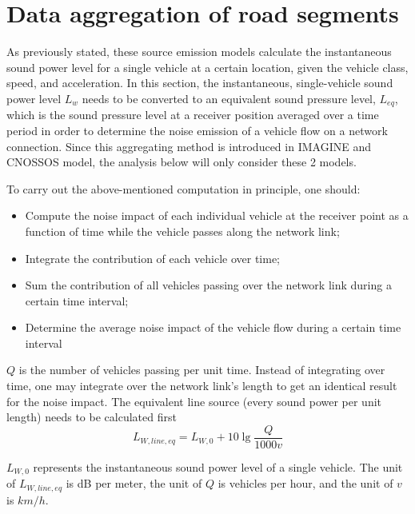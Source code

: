 \documentclass{article}
\begin{document}
\section{Data aggregation of road segments}
\noindent As previously stated, these source emission models calculate the instantaneous sound power level for a single vehicle at a certain location, given the vehicle class, speed, and acceleration. In this section, the instantaneous, single-vehicle sound power level $L_w$ needs to be converted to an equivalent sound pressure level, $L_{e q}$, which is the sound pressure level at a receiver position averaged over a time period in order to determine the noise emission of a vehicle flow on a network connection. Since this aggregating method is introduced in IMAGINE and CNOSSOS model, the analysis below will only consider these 2 models.
 
\noindent To carry out the above-mentioned computation in principle, one should: 
{\color{red} 
\begin{itemize}
    \item Compute the noise impact of each individual vehicle at the receiver point as a function of time while the vehicle passes along the network link; 
    \item Integrate the contribution of each vehicle over time; 
    \item Sum the contribution of all vehicles passing over the network link during a certain time interval; 
    \item Determine the average noise impact of the vehicle flow during a certain time interval
\end{itemize}
}

 $Q$ is the number of vehicles passing per unit time. Instead of integrating over time, one may integrate over the network link's length to get an identical result for the noise impact. The equivalent line source (every sound power per unit length) needs to be calculated first
\begin{equation}
    L_{W,line,eq}=L_{W,0}+10 \lg{\frac{Q}{1000v}}
\end{equation}

\noindent $L_{W,0}$ represents the instantaneous sound power level of a single vehicle. The unit of $L_{W,line,eq}$ is dB per meter, the unit of $Q$ is vehicles per hour, and the unit of $v$ is $km/h$.
\end{document}

